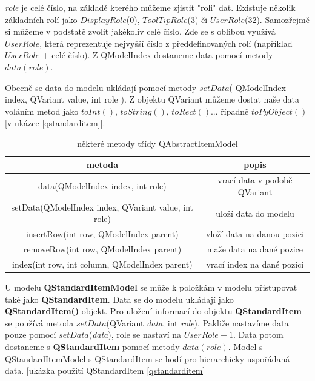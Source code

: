 \textit{role} je celé číslo, na základě kterého můžeme zjistit "roli" dat. Existuje několik základních rolí jako $DisplayRole$(0), $ToolTipRole$(3) či $UserRole$(32). Samozřejmě si můžeme v podstatě zvolit jakékoliv celé číslo. Zde se s oblibou využívá $UserRole$, která reprezentuje nejvyšší číslo z předdefinovaných rolí (například $UserRole$ + celé číslo). Z QModelIndex dostaneme data pomocí metody $data(role)$.

Obecně se data do modelu ukládají pomocí metody $setData$( QModelIndex index, QVariant value, int role ). Z objektu QVariant můžeme dostat naše data voláním metod jako $toInt()$, $toString()$, $toRect()$... řípadně $toPyObject()$ [v ukázce \ref{qstandarditem}]. 


\begin{table}	
	\centering
	\begin{tabular}{|c|c|}
		\hline	
		metoda & popis \\
		\hline
		\hline
		data(QModelIndex index, int role) & vrací data v podobě QVariant \\
		\hline
		setData(QModelIndex index, QVariant value, int role) & uloží data do modelu \\
		\hline
		insertRow(int row, QModelIndex parent) & vloží data na danou pozici \\
		\hline
		removeRow(int row, QModelIndex parent) & maže data na dané pozice \\
		\hline
		index(int row, int column, QModelIndex parent) & vrací index na dané pozici \\
		\hline


	\end{tabular}
	\caption{některé metody třídy QAbstractItemModel}
	\label{tab:qabsmodel}
\end{table}

U modelu \textbf{QStandardItemModel} se může k položkám v modelu přistupovat také jako \textbf{QStandardItem}. Data se do modelu ukládají jako \textbf{QStandardItem()} objekt. Pro uložení informací do objektu \textbf{QStandardItem} se používá metoda $setData$(QVariant \textit{data}, int \textit{role}). Pakliže nastavíme data pouze pomocí $setData$(\textit{data}), role se nastaví na $UserRole + 1$. Data potom dostaneme s \textbf{QStandardItem} pomocí metody $data(role)$. Model s QStandardItemModel s QStandardItem se hodí pro hierarchicky uspořádaná data. [ukázka použití QStandardItem \ref{qstandarditem} \\

